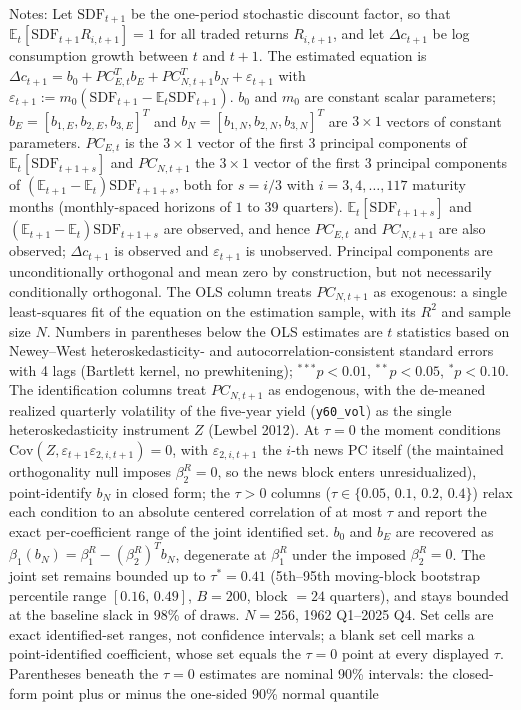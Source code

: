 \begin{table}[!htbp]
\begin{threeparttable}
\begin{tablenotes}[flushleft]
\item Notes: Let $\mathrm{SDF}_{t+1}$ be the one-period stochastic discount factor, so that $\mathbb{E}_{t}[\mathrm{SDF}_{t+1}R_{i,t+1}]=1$ for all traded returns $R_{i,t+1}$, and let $\Delta c_{t+1}$ be log consumption growth between $t$ and $t+1$. The estimated equation is $\Delta c_{t+1}=b_{0}+PC_{E,t}^{T}b_{E}+PC_{N,t+1}^{T}b_{N}+\varepsilon_{t+1}$ with $\varepsilon_{t+1}:=m_{0}(\mathrm{SDF}_{t+1}-\mathbb{E}_{t}\mathrm{SDF}_{t+1})$. $b_{0}$ and $m_{0}$ are constant scalar parameters; $b_{E}=[b_{1,E},b_{2,E},b_{3,E}]^{T}$ and $b_{N}=[b_{1,N},b_{2,N},b_{3,N}]^{T}$ are $3\times1$ vectors of constant parameters. $PC_{E,t}$ is the $3\times1$ vector of the first 3 principal components of $\mathbb{E}_{t}[\mathrm{SDF}_{t+1+s}]$ and $PC_{N,t+1}$ the $3\times1$ vector of the first 3 principal components of $(\mathbb{E}_{t+1}-\mathbb{E}_{t})\mathrm{SDF}_{t+1+s}$, both for $s=i/3$ with $i=3,4,\ldots,117$ maturity months (monthly-spaced horizons of $1$ to $39$ quarters). $\mathbb{E}_{t}[\mathrm{SDF}_{t+1+s}]$ and $(\mathbb{E}_{t+1}-\mathbb{E}_{t})\mathrm{SDF}_{t+1+s}$ are observed, and hence $PC_{E,t}$ and $PC_{N,t+1}$ are also observed; $\Delta c_{t+1}$ is observed and $\varepsilon_{t+1}$ is unobserved. Principal components are unconditionally orthogonal and mean zero by construction, but not necessarily conditionally orthogonal. The OLS column treats $PC_{N,t+1}$ as exogenous: a single least-squares fit of the equation on the estimation sample, with its $R^2$ and sample size $N$. Numbers in parentheses below the OLS estimates are $t$ statistics based on Newey--West heteroskedasticity- and autocorrelation-consistent standard errors with 4 lags (Bartlett kernel, no prewhitening); $^{***}p<0.01$, $^{**}p<0.05$, $^{*}p<0.10$. The identification columns treat $PC_{N,t+1}$ as endogenous, with the de-meaned realized quarterly volatility of the five-year yield (\texttt{y60\_vol}) as the single heteroskedasticity instrument $Z$ (Lewbel 2012). At $\tau{=}0$ the moment conditions $\mathrm{Cov}(Z,\varepsilon_{t+1}\varepsilon_{2,i,t+1})=0$, with $\varepsilon_{2,i,t+1}$ the $i$-th news PC itself (the maintained orthogonality null imposes $\beta_{2}^{R}=0$, so the news block enters unresidualized), point-identify $b_{N}$ in closed form; the $\tau{>}0$ columns ($\tau\in\{0.05,\,0.1,\,0.2,\,0.4\}$) relax each condition to an absolute centered correlation of at most $\tau$ and report the exact per-coefficient range of the joint identified set. $b_{0}$ and $b_{E}$ are recovered as $\beta_{1}(b_{N})=\beta_{1}^{R}-(\beta_{2}^{R})^{T}b_{N}$, degenerate at $\beta_{1}^{R}$ under the imposed $\beta_{2}^{R}=0$. The joint set remains bounded up to $\tau^{*}=0.41$ (5th--95th moving-block bootstrap percentile range $[0.16,\,0.49]$, $B=200$, block $=24$ quarters), and stays bounded at the baseline slack in 98\% of draws. $N=256$, 1962 Q1--2025 Q4. Set cells are exact identified-set ranges, not confidence intervals; a blank set cell marks a point-identified coefficient, whose set equals the $\tau{=}0$ point at every displayed $\tau$. Parentheses beneath the $\tau{=}0$ estimates are nominal 90\% intervals: the closed-form point plus or minus the one-sided 90\% normal quantile 
\end{tablenotes}
\end{threeparttable}
\end{table}
